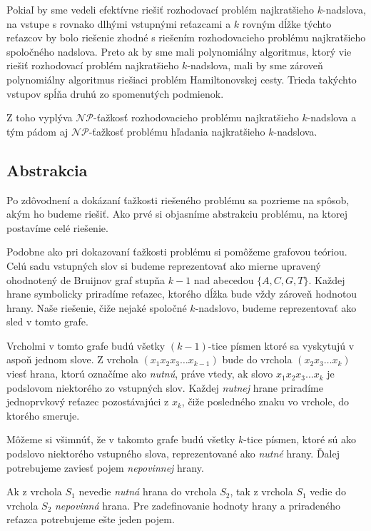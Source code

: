 Pokiaľ by sme vedeli efektívne riešiť rozhodovací problém najkratšieho $k$-nadslova,
na vstupe s rovnako dlhými vstupnými reťazcami a $k$ rovným dĺžke týchto reťazcov by
bolo riešenie zhodné s riešením rozhodovacieho problému najkratšieho spoločného nadslova.
Preto ak by sme mali polynomiálny algoritmus, ktorý vie riešiť rozhodovací problém
najkratšieho $k$-nadslova, mali by sme zároveň polynomiálny algoritmus riešiaci problém
Hamiltonovskej cesty. Trieda takýchto vstupov spĺňa druhú zo spomenutých podmienok.

Z toho vyplýva $\mathcal{NP}$-ťažkosť rozhodovacieho problému
najkratšieho $k$-nadslova a tým pádom aj $\mathcal{NP}$-ťažkosť problému hľadania
najkratšieho $k$-nadslova.

\subsection{Abstrakcia}

Po zdôvodnení a dokázaní ťažkosti riešeného problému sa pozrieme na spôsob, akým ho budeme
riešiť. Ako prvé si objasníme abstrakciu problému, na ktorej postavíme celé riešenie.

Podobne ako pri dokazovaní ťažkosti problému si pomôžeme grafovou teóriou. Celú
sadu vstupných slov si budeme reprezentovať ako mierne upravený ohodnotený de Bruijnov graf stupňa $k - 1$ nad
abecedou $\{A, C, G, T\}$. Každej hrane symbolicky priradíme reťazec, ktorého dĺžka bude
vždy zároveň hodnotou hrany.
Naše riešenie, čiže nejaké spoločné $k$-nadslovo, budeme reprezentovať ako sled v tomto grafe.

Vrcholmi v tomto grafe budú všetky $(k - 1)$-tice písmen ktoré sa vyskytujú v aspoň jednom slove.
Z vrchola $\left(x_1 x_2 x_3 \ldots x_{k-1}\right)$ bude do vrchola $\left(x_2 x_3 \ldots x_k\right)$
viesť hrana, ktorú označíme ako \emph{nutnú},
práve vtedy, ak slovo $x_1 x_2 x_3 \ldots x_k$ je podslovom niektorého zo
vstupných slov. Každej \emph{nutnej} hrane priradíme jednoprvkový reťazec pozostávajúci z $x_k$, čiže
posledného znaku vo vrchole, do ktorého smeruje.

Môžeme si všimnúť, že v takomto grafe budú všetky $k$-tice písmen, ktoré sú
ako podslovo niektorého vstupného slova, reprezentované ako \emph{nutné} hrany. Ďalej
potrebujeme zaviesť pojem \emph{nepovinnej} hrany.

Ak z vrchola $S_1$ nevedie \emph{nutná} hrana do vrchola $S_2$, tak z vrchola
$S_1$ vedie do vrchola $S_2$ \emph{nepovinná} hrana. Pre zadefinovanie hodnoty
hrany a priradeného reťazca potrebujeme ešte jeden pojem.

